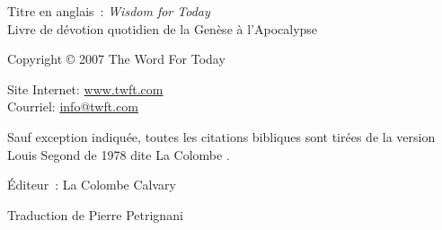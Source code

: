 \newpage
\mbox{}
\vfill
\noindent Titre en anglais~: \emph{Wisdom for Today}\\
Livre de dévotion quotidien de la Genèse à l'Apocalypse

\noindent Copyright \copyright{} 2007 The Word For Today

\noindent Site Internet: \url{www.twft.com}\\
\noindent Courriel: \url{info@twft.com}

\noindent Sauf exception indiquée, toutes les citations bibliques sont tirées de
 la version Louis Segond de 1978 dite \og La Colombe \fg{}.


\noindent Éditeur~: La Colombe Calvary

\noindent Traduction de Pierre Petrignani

